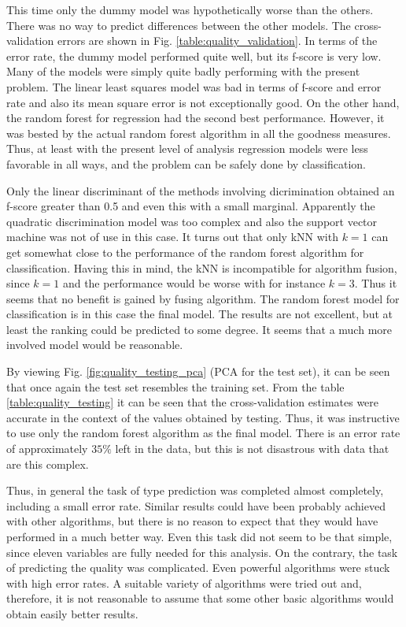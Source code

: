 \documentclass[twoside]{article}
\begin{document}
\begin{multicols}{2}
This time only the dummy model was hypothetically worse than the others. There was no way to predict differences between the other models. The 
cross-validation errors are shown in Fig. \ref{table:quality_validation}. In terms of the error rate, the dummy model performed quite well, but its 
f-score is very low. Many of the models were simply quite badly performing with the present problem. The linear least squares model was bad 
in terms of f-score and error rate and also its mean square error is not exceptionally good. On the other hand, the random forest for regression
had the second best performance. However, it was bested by the actual random forest algorithm in all the goodness measures. Thus, at least with
the present level of analysis regression models were less favorable in all ways, and the problem can be safely done by classification.

Only the linear discriminant of the methods involving dicrimination obtained an f-score greater than 0.5 and even this with a small marginal.
Apparently the quadratic discrimination model was too complex and also the support vector machine was not of use in this case. It turns out 
that only kNN with $k = 1$ can get somewhat close to the performance of the random forest algorithm for classification. Having this in mind,
the kNN is incompatible for algorithm fusion, since $k = 1$ and the performance would be worse with for instance $k = 3$. Thus it seems that
no benefit is gained by fusing algorithm. The random forest model for classification is in this case the final model. The results are not
excellent, but at least the ranking could be predicted to some degree. It seems that a much more involved model would be reasonable.

By viewing Fig. \ref{fig:quality_testing_pca} (PCA for the test set), it can be seen that once again the test set resembles the training set.
From the table \ref{table:quality_testing} it can be seen that the cross-validation estimates were accurate in the context of the values
obtained by testing. Thus, it was instructive to use only the random forest algorithm as the final model. There is an error rate of approximately
$35 \%$ left in the data, but this is not disastrous with data that are this complex.

Thus, in general the task of type prediction was completed almost completely, including a small error rate. Similar results could have been probably
achieved with other algorithms, but there is no reason to expect that they would have performed in a much better way. Even this task did not seem 
to be that simple, since eleven variables are fully needed for this analysis. On the contrary, the task of predicting the quality was
complicated. Even powerful algorithms were stuck with high error rates. A suitable variety of algorithms were tried out and, therefore, it is 
not reasonable to assume that some other basic algorithms would obtain easily better results. 


\end{multicols}
\end{document}
